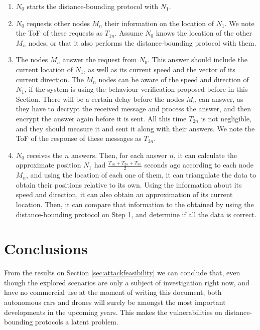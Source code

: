 \documentclass{article}
\begin{document}
\begin{enumerate}
  \item $N_{0}$ starts the distance-bounding protocol with $N_{1}$.
  \item $N_{0}$ requests other nodes $M_{n}$ their information on the location of $N_{1}$. We note the ToF of these requests as $T_{1n}$. Assume $N_{0}$ knows the location of the other $M_{n}$ nodes, or that it also performs the distance-bounding protocol with them.
  \item The nodes $M_{n}$ answer the request from $N_{0}$. This answer should include the current location of $N_{1}$, as well as its current speed and the vector of its current direction. The $M_{n}$ nodes can be aware of the speed and direction of $N_{1}$, if the system is using the behaviour verification proposed before in this Section. There will be a certain delay before the nodes $M_{n}$ can answer, as they have to decrypt the received message and process the answer, and then encrypt the answer again before it is sent. All this time $T_{2n}$ is not negligible, and they should measure it and sent it along with their answers. We note the ToF of the response of these messages as $T_{3n}$.
  \item $N_{0}$ receives the $n$ answers. Then, for each answer $n$, it can calculate the approximate position $N_{1}$ had $\frac{T_{1n}+T_{2n}+T_{3n}}{2}$ seconds ago according to each node $M_{n}$, and using the location of each one of them, it can triangulate the data to obtain their positions relative to its own. Using the information about its speed and direction, it can also obtain an approximation of its current location. Then, it can compare that information to the obtained by using the distance-bounding protocol on Step 1, and determine if all the data is correct.
\end{enumerate}












\section{Conclusions}
\label{sec:conclusions}

From the results on Section \ref{sec:attackfeasibility} we can conclude that, even though the explored scenarios are only a subject of investigation right now, and have no commercial use at the moment of writing this document, both autonomous cars and drones will surely be amongst the most important developments in the upcoming years. This makes the vulnerabilities on distance-bounding protocols a latent problem.\\
\end{document}
